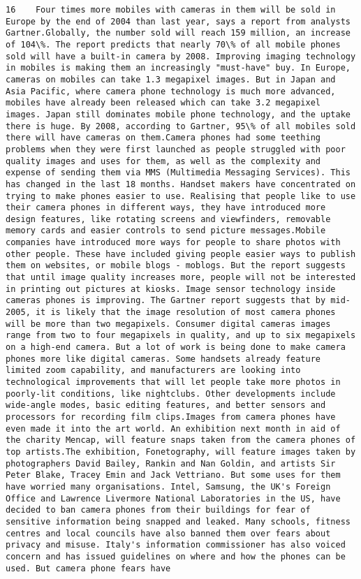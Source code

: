 \documentclass[11pt]{article}
\begin{document}
\begin{Verbatim}[commandchars=\\\{\}]
         16    Four times more mobiles with cameras in them will be sold in Europe by the end of 2004 than last year, says a report from analysts Gartner.Globally, the number sold will reach 159 million, an increase of 104\%. The report predicts that nearly 70\% of all mobile phones sold will have a built-in camera by 2008. Improving imaging technology in mobiles is making them an increasingly "must-have" buy. In Europe, cameras on mobiles can take 1.3 megapixel images. But in Japan and Asia Pacific, where camera phone technology is much more advanced, mobiles have already been released which can take 3.2 megapixel images. Japan still dominates mobile phone technology, and the uptake there is huge. By 2008, according to Gartner, 95\% of all mobiles sold there will have cameras on them.Camera phones had some teething problems when they were first launched as people struggled with poor quality images and uses for them, as well as the complexity and expense of sending them via MMS (Multimedia Messaging Services). This has changed in the last 18 months. Handset makers have concentrated on trying to make phones easier to use. Realising that people like to use their camera phones in different ways, they have introduced more design features, like rotating screens and viewfinders, removable memory cards and easier controls to send picture messages.Mobile companies have introduced more ways for people to share photos with other people. These have included giving people easier ways to publish them on websites, or mobile blogs - moblogs. But the report suggests that until image quality increases more, people will not be interested in printing out pictures at kiosks. Image sensor technology inside cameras phones is improving. The Gartner report suggests that by mid-2005, it is likely that the image resolution of most camera phones will be more than two megapixels. Consumer digital cameras images range from two to four megapixels in quality, and up to six megapixels on a high-end camera. But a lot of work is being done to make camera phones more like digital cameras. Some handsets already feature limited zoom capability, and manufacturers are looking into technological improvements that will let people take more photos in poorly-lit conditions, like nightclubs. Other developments include wide-angle modes, basic editing features, and better sensors and processors for recording film clips.Images from camera phones have even made it into the art world. An exhibition next month in aid of the charity Mencap, will feature snaps taken from the camera phones of top artists.The exhibition, Fonetography, will feature images taken by photographers David Bailey, Rankin and Nan Goldin, and artists Sir Peter Blake, Tracey Emin and Jack Vettriano. But some uses for them have worried many organisations. Intel, Samsung, the UK's Foreign Office and Lawrence Livermore National Laboratories in the US, have decided to ban camera phones from their buildings for fear of sensitive information being snapped and leaked. Many schools, fitness centres and local councils have also banned them over fears about privacy and misuse. Italy's information commissioner has also voiced concern and has issued guidelines on where and how the phones can be used. But camera phone fears have 
\end{Verbatim}
\end{document}
